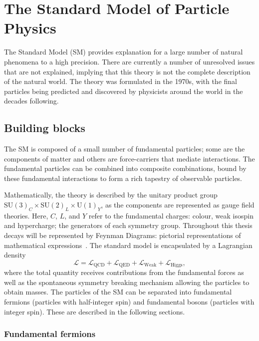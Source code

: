 \section{The Standard Model of Particle Physics}

The Standard Model (SM) provides explanation for a large number of natural phenomena to a high precision. There are currently a number of unresolved issues that are not explained, implying that this theory is not the complete description of the natural world. The theory was formulated in the 1970s, with the final particles being predicted and discovered by physicists around the world in the decades following.

\subsection{Building blocks}

The SM is composed of a small number of fundamental particles; some are the components of matter and others are force-carriers that mediate interactions. The fundamental particles can be combined into composite combinations, bound by these fundamental interactions to form a rich tapestry of observable particles.

Mathematically, the theory is described by the unitary product group $\text{SU}(3)_{C}\times\text{SU}(2)_{L}\times\text{U}(1)_{Y}$, as the components are represented as gauge field theories. Here, $C$, $L$, and $Y$ refer to the fundamental charges: colour, weak isospin and hypercharge; the generators of each symmetry group. Throughout this thesis decays will be represented by Feynman Diagrams: pictorial representations of mathematical expressions~\cite{PhysRev.76.749}.  
The standard model is encapsulated by a Lagrangian density
\begin{equation}
\mathcal{L} = \mathcal{L}_{\text{QCD}}+\mathcal{L}_{\text{QED}}+\mathcal{L}_{\text{Weak}}+\mathcal{L}_{\text{Higgs}},
\end{equation}
where the total quantity receives contributions from the fundamental forces as well as the spontaneous symmetry breaking mechanism allowing the particles to obtain masses. 
The particles of the SM can be separated into fundamental fermions (particles with half-integer spin) and fundamental bosons (particles with integer spin). These are described in the following sections.  


\subsubsection{Fundamental fermions}

